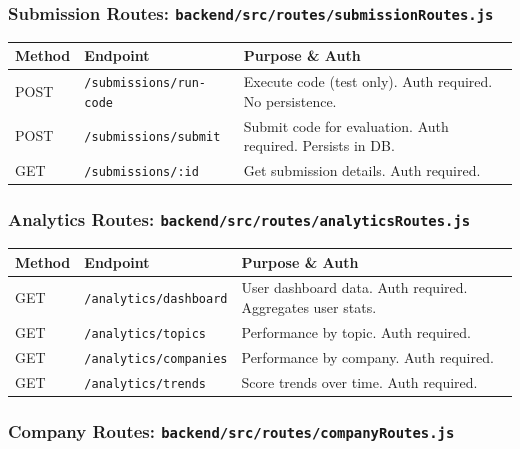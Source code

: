 \documentclass[12pt,a4paper,oneside]{article}
\newcommand{\fileref}[1]{\texttt{#1}}
\begin{document}
\subsubsection{Submission Routes: \fileref{backend/src/routes/submissionRoutes.js}}

\begin{table}[H]
\centering
\begin{tabular}{|p{1.5cm}|p{3cm}|p{10cm}|}
\hline
\textbf{Method} & \textbf{Endpoint} & \textbf{Purpose \& Auth} \\
\hline
POST & \texttt{/submissions/run-code} & Execute code (test only). Auth required. No persistence. \\
\hline
POST & \texttt{/submissions/submit} & Submit code for evaluation. Auth required. Persists in DB. \\
\hline
GET & \texttt{/submissions/:id} & Get submission details. Auth required. \\
\hline
\end{tabular}
\end{table}

\subsubsection{Analytics Routes: \fileref{backend/src/routes/analyticsRoutes.js}}

\begin{table}[H]
\centering
\begin{tabular}{|p{1.5cm}|p{3cm}|p{10cm}|}
\hline
\textbf{Method} & \textbf{Endpoint} & \textbf{Purpose \& Auth} \\
\hline
GET & \texttt{/analytics/dashboard} & User dashboard data. Auth required. Aggregates user stats. \\
\hline
GET & \texttt{/analytics/topics} & Performance by topic. Auth required. \\
\hline
GET & \texttt{/analytics/companies} & Performance by company. Auth required. \\
\hline
GET & \texttt{/analytics/trends} & Score trends over time. Auth required. \\
\hline
\end{tabular}
\end{table}

\subsubsection{Company Routes: \fileref{backend/src/routes/companyRoutes.js}}
\end{document}
